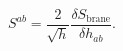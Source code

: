 \begin{equation}
S^{ab}=\frac{2}{\sqrt{h}} \frac{\delta S_\textrm{brane}}{\delta h_{ab}}.
\end{equation}


